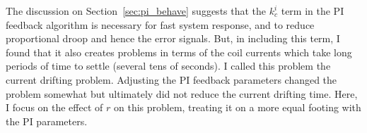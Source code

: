 
The discussion on Section~\ref{sec:pi_behave} suggests that the
$k_c^i$ term in the PI feedback algorithm is necessary for fast system
response, and to reduce proportional droop and hence the error
signals.  But, in including this term, I found that it also creates
problems in terms of the coil currents which take long periods of time
to settle (several tens of seconds).  I called this problem the
current drifting problem.  Adjusting the PI feedback parameters
changed the problem somewhat but ultimately did not reduce the current
drifting time.  Here, I focus on the effect of $r$ on this problem,
treating it on a more equal footing with the PI parameters.



